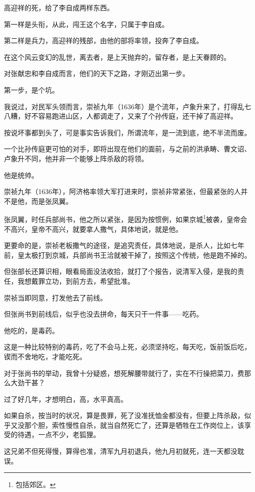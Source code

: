 \begin{multicols}{\theparacolNo}
		高迎祥的死，给了李自成两样东西。

		第一样是头衔，从此，闯王这个名字，只属于李自成。

		第二样是兵力，高迎祥的残部，由他的部将率领，投奔了李自成。

		在这个风云变幻的乱世，离去者，是上天抛弃的，留存者，是上天眷顾的。

		对张献忠和李自成而言，他们的天下之路，才刚迈出第一步。

		第一步，是个坑。

		我说过，对民军头领而言，崇祯九年（1636年）是个流年，卢象升来了，打得乱七八糟，好不容易跑进山区，人都调走了，又来了个孙传庭，还干掉了高迎祥。

		按说坏事都到头了，可是事实告诉我们，所谓流年，是一流到底，绝不半流而废。

		一个比孙传庭更可怕的对手，即将出现在他们的面前，与之前的洪承畴、曹文诏、卢象升不同，他并非一个能够上阵杀敌的将领。

		他是统帅。

		崇祯九年（1636年），阿济格率领大军打进来时，崇祯非常紧张，但最紧张的人并不是他，而是张凤翼。

		张凤翼，时任兵部尚书，他之所以紧张，是因为按惯例，如果京城\footnote{包括郊区。}被袭，皇帝会不高兴，皇帝不高兴，就要拿人撒气，具体地说，就是他。

		更要命的是，崇祯老板撒气的途径，是追究责任，具体地说，是杀人，比如七年前，皇太极打到京城，兵部尚书王洽就被干掉了，按照这个传统，他是跑不掉的。

		但张部长还算识相，眼看局面没法收拾，就打了个报告，说清军入侵，是我的责任，我想戴罪立功，到前方去，希望批准。

		崇祯当即同意，打发他去了前线。

		但张尚书到前线后，似乎也没去拼命，每天只干一件事——吃药。

		他吃的，是毒药。

		这是一种比较特别的毒药，吃了不会马上死，必须坚持吃，每天吃，饭前饭后吃，锲而不舍地吃，才能吃死。

		对于张尚书的举动，我曾十分疑惑，想死解腰带就行了，实在不行操把菜刀，费那么大劲干甚？

		过了好几年，才想明白，高，水平真高。

		如果自杀，按当时的状况，算是畏罪，死了没准抚恤金都没有，但要上阵杀敌，似乎又没那个胆，索性慢性自杀，就当自然死亡了，还算是牺牲在工作岗位上，该享受的待遇，一点不少，老狐狸。

		这兄弟不但死得慢，算得也准，清军九月初退兵，他九月初就死，连一天都没耽误。


\end{multicols}
